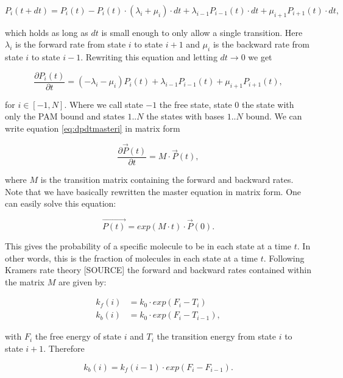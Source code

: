 \begin{equation}
P_i(t+dt) = P_i(t) - P_i(t)\cdot (\lambda_i + \mu_i)\cdot dt + \lambda_{i-1}P_{i-1}(t)\cdot dt + \mu_{i+1}P_{i+1}(t)\cdot dt,
\end{equation}

which holds as long as $dt$ is small enough to only allow a single transition. Here $\lambda_i$ is the forward rate from state $i$ to state $i+1$ and $\mu_i$ is the backward rate from state $i$ to state $i-1$. Rewriting this equation and letting $dt \rightarrow 0$ we get

\begin{equation}
\label{eq:dpdtmasteri}
\frac{\partial P_i(t)}{\partial t} = (-\lambda_i - \mu_i)P_i(t) + \lambda_{i-1}P_{i-1}(t) + \mu_{i+1}P_{i+1}(t),
\end{equation}

for $i \in [-1,N]$. Where we call state $-1$ the free state, state $0$ the state with only the PAM bound and states $1..N$ the states with bases $1..N$ bound. We can write equation \ref{eq:dpdtmasteri} in matrix form

\begin{equation}
\label{eq:mastermatrix}
\frac{\partial \vec{P}(t)}{\partial t} = M\cdot \vec{P}(t),
\end{equation}

where $M$ is the transition matrix containing the forward and backward rates. Note that we have basically rewritten the master equation in matrix form. One can easily solve this equation:

\begin{equation}
\label{eq:MasterEquationSolution}
\vec{P(t)} = exp(M\cdot t) \cdot \vec{P}(0).
\end{equation}

This gives the probability of a specific molecule to be in each state at a time $t$. In other words, this is the fraction of molecules in each state at a time $t$. Following Kramers rate theory [SOURCE] the forward and backward rates contained within the matrix $M$ are given by:

\begin{align}
\label{eq:Kramer}
k_f(i) &= k_0 \cdot exp(F_i - T_i) \\
k_b(i) &= k_0 \cdot exp(F_i - T_{i-1}),
\end{align}

with $F_i$ the free energy of state $i$ and $T_i$ the transition energy from state $i$ to state $i+1$. Therefore

\begin{equation}
k_b(i) = k_f(i-1) \cdot exp(F_{i}-F_{i-1}).
\end{equation}

